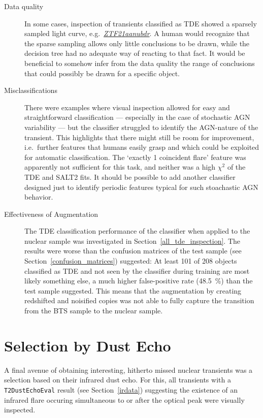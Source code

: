 \begin{description}
  \item[Data quality] In some cases, inspection of transients classified as TDE showed a sparsely sampled light curve, e.g.~\textit{\href{https://ztfnuclear.simeonreusch.com/transient/ZTF21aanubdr}{ZTF21aanubdr}}. A human would recognize that the sparse sampling allows only little conclusions to be drawn, while the decision tree had no adequate way of reacting to that fact. It would be beneficial to somehow infer from the data quality the range of conclusions that could possibly be drawn for a specific object.
  \item[Misclassifications] There were examples where visual inspection allowed for easy and straightforward classification --- especially in the case of stochastic AGN variability --- but the classifier struggled to identify the AGN-nature of the transient. This highlights that there might still be room for improvement, i.e.~further features that humans easily grasp and which could be exploited for automatic classification. The `exactly 1 coincident flare' feature was apparently not sufficient for this task, and neither was a high $\chi^2$ of the TDE and SALT2 fits. It should be possible to add another classifier designed just to identify periodic features typical for such stoachastic AGN behavior.
  \item[Effectiveness of Augmentation] The TDE classification performance of the classifier when applied to the nuclear sample was investigated in Section~\ref{all_tde_inspection}. The results were worse than the confusion matrices of the test sample (see Section~\ref{confusion_matrices}) suggested: At least 101 of 208 objects classified as TDE and not seen by the classifier during training are most likely something else, a much higher false-positive rate (\SI{48.5}{\percent}) than the test sample suggested. This means that the augmentation by creating redshifted and noisified copies was not able to fully capture the transition from the BTS sample to the nuclear sample.
\end{description}

\section{Selection by Dust Echo}\label{dustecho_sel}
A final avenue of obtaining interesting, hitherto missed nuclear transients was a selection based on their infrared dust echo. For this, all transients with a \texttt{T2DustEchoEval} result (see Section~\ref{irdata}) suggesting the existence of an infrared flare occuring simultaneous to or after the optical peak were visually inspected.

